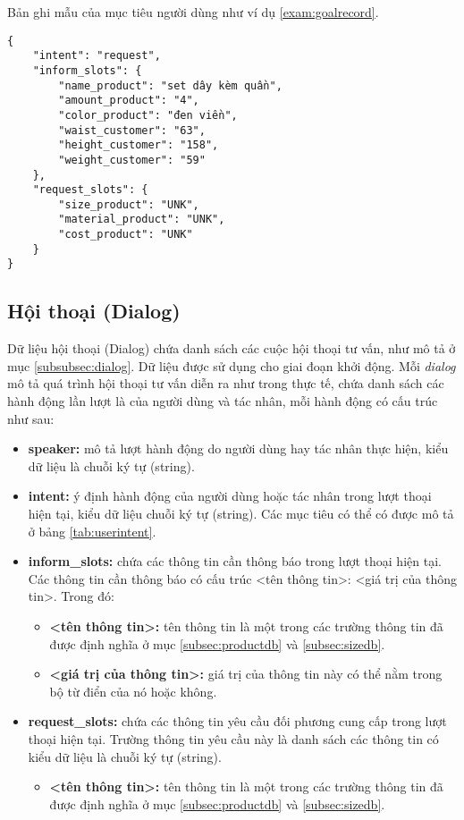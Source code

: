 Bản ghi mẫu của mục tiêu người dùng như ví dụ \ref{exam:goalrecord}.

\renewcommand{\lstlistingname}{Ví dụ}
\begin{lstlisting}[caption={Một bản ghi của mục tiêu người dùng},label={exam:goalrecord},language=code_vn,firstnumber=1]
{
    "intent": "request",
    "inform_slots": {
        "name_product": "set dây kèm quần",
        "amount_product": "4",
        "color_product": "đen viền",
        "waist_customer": "63",
        "height_customer": "158",
        "weight_customer": "59"
    },
    "request_slots": {
        "size_product": "UNK",
        "material_product": "UNK",
        "cost_product": "UNK"
    }
}
\end{lstlisting}

\subsection{Hội thoại (Dialog)}
Dữ liệu hội thoại (Dialog) chứa danh sách các cuộc hội thoại tư vấn, như mô tả ở mục \ref{subsubsec:dialog}. Dữ liệu được sử dụng cho giai đoạn khởi động. Mỗi \textit{dialog} mô tả quá trình hội thoại tư vấn diễn ra như trong thực tế, chứa danh sách các hành động lần lượt là của người dùng và tác nhân, mỗi hành động có cấu trúc như sau:

\begin{itemize}
    \item \textbf{speaker:} mô tả lượt hành động do người dùng hay tác nhân thực hiện, kiểu dữ liệu là chuỗi ký tự (string).
    \item \textbf{intent:} ý định hành động của người dùng hoặc tác nhân trong lượt thoại hiện tại, kiểu dữ liệu chuỗi ký tự (string). Các mục tiêu có thể có được mô tả ở bảng \ref{tab:userintent}.
    \item \textbf{inform\_slots:} chứa các thông tin cần thông báo trong lượt thoại hiện tại. Các thông tin cần thông báo có cấu trúc <tên thông tin>: <giá trị của thông tin>. Trong đó:
    \begin{itemize}
        \item \textbf{<tên thông tin>:} tên thông tin là một trong các trường thông tin đã được định nghĩa ở mục \ref{subsec:productdb} và \ref{subsec:sizedb}.
        \item \textbf{<giá trị của thông tin>:} giá trị của thông tin này có thể nằm trong bộ từ điển của nó hoặc không.
    \end{itemize}
    \item \textbf{request\_slots:} chứa các thông tin yêu cầu đối phương cung cấp trong lượt thoại hiện tại. Trường thông tin yêu cầu này là danh sách các thông tin có kiểu dữ liệu là chuỗi ký tự (string).
    \begin{itemize}
        \item \textbf{<tên thông tin>:} tên thông tin là một trong các trường thông tin đã được định nghĩa ở mục \ref{subsec:productdb} và \ref{subsec:sizedb}.
    \end{itemize}
\end{itemize}

